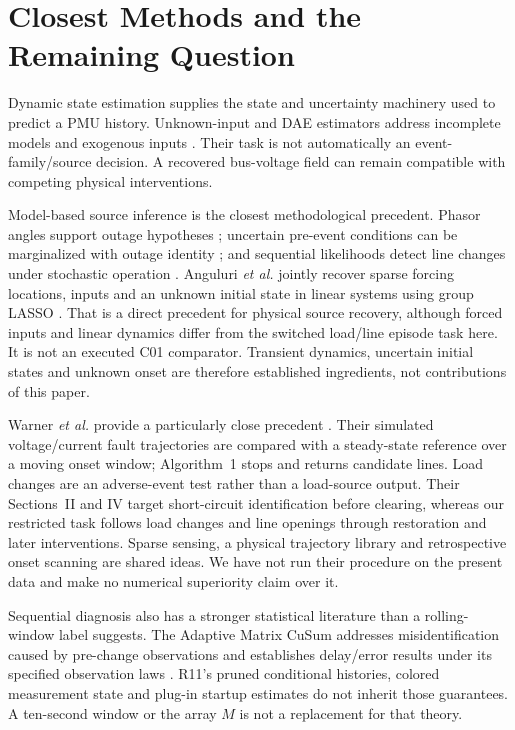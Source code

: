 \section{Closest Methods and the Remaining Question}
\label{sec:narrative-related}

Dynamic state estimation supplies the state and uncertainty machinery used to predict a PMU history. Unknown-input and DAE estimators address incomplete models and exogenous inputs \cite{gillijns2007input,nugroho2022dae,katanic2024recursive}. Their task is not automatically an event-family/source decision. A recovered bus-voltage field can remain compatible with competing physical interventions.

Model-based source inference is the closest methodological precedent. Phasor angles support outage hypotheses \cite{tate2008outage}; uncertain pre-event conditions can be marginalized with outage identity \cite{zhao2014outages}; and sequential likelihoods detect line changes under stochastic operation \cite{chen2016quickest,rovatsos2017outage}. Anguluri \emph{et al.} jointly recover sparse forcing locations, inputs and an unknown initial state in linear systems using group LASSO \cite{anguluri2023group}. That is a direct precedent for physical source recovery, although forced inputs and linear dynamics differ from the switched load/line episode task here. It is not an executed C01 comparator. Transient dynamics, uncertain initial states and unknown onset are therefore established ingredients, not contributions of this paper.

Warner \emph{et al.} provide a particularly close precedent \cite{warner2023highfidelity}. Their simulated voltage/current fault trajectories are compared with a steady-state reference over a moving onset window; Algorithm~1 stops and returns candidate lines. Load changes are an adverse-event test rather than a load-source output. Their Sections~II and IV target short-circuit identification before clearing, whereas our restricted task follows load changes and line openings through restoration and later interventions. Sparse sensing, a physical trajectory library and retrospective onset scanning are shared ideas. We have not run their procedure on the present data and make no numerical superiority claim over it.

Sequential diagnosis also has a stronger statistical literature than a rolling-window label suggests. The Adaptive Matrix CuSum addresses misidentification caused by pre-change observations and establishes delay/error results under its specified observation laws \cite{warner2024matrix}. R11's pruned conditional histories, colored measurement state and plug-in startup estimates do not inherit those guarantees. A ten-second window or the array $M$ is not a replacement for that theory.

